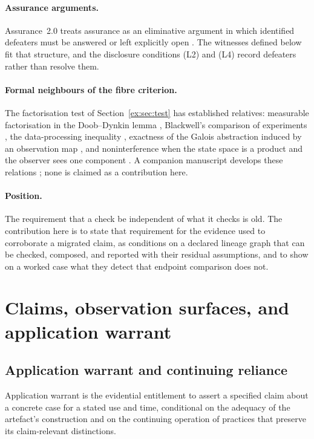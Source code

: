 \documentclass[smallextended,envcountsect,envcountsame,natbib]{svjour3}
\begin{document}
\paragraph{Assurance arguments.} Assurance~2.0 treats assurance as an eliminative argument in which identified defeaters must be answered or left explicitly open \citep{bloomfieldrushby2021,bloomfieldnetkachovarushby2024}. The witnesses defined below fit that structure, and the disclosure conditions (L2) and (L4) record defeaters rather than resolve them.

\paragraph{Formal neighbours of the fibre criterion.} The factorisation test of Section~\ref{ex:sec:test} has established relatives: measurable factorisation in the Doob--Dynkin lemma \citep[Lemma~1.13]{kallenberg2002}, Blackwell's comparison of experiments \citep{blackwell1953}, the data-processing inequality \citep{coverthomas2006}, exactness of the Galois abstraction induced by an observation map \citep{cousot1977}, and noninterference when the state space is a product and the observer sees one component \citep{goguenmeseguer1982}. A companion manuscript develops these relations \citep{moore2026exactness}; none is claimed as a contribution here.

\paragraph{Position.} The requirement that a check be independent of what it checks is old. The contribution here is to state that requirement for the evidence used to corroborate a migrated claim, as conditions on a declared lineage graph that can be checked, composed, and reported with their residual assumptions, and to show on a worked case what they detect that endpoint comparison does not.

\section{Claims, observation surfaces, and application warrant}\label{ex:sec:static}

\subsection{Application warrant and continuing reliance}\label{ex:sec:warrant}

\begin{definition}\label{ex:def:warrant}
Application warrant is the evidential entitlement to assert a specified claim about a concrete case for a stated use and time, conditional on the adequacy of the artefact's construction and on the continuing operation of practices that preserve its claim-relevant distinctions.
\end{definition}
\end{document}
